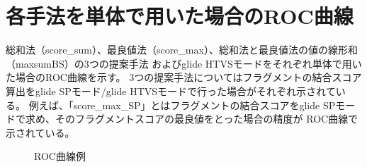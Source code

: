 \chapter{各手法を単体で用いた場合のROC曲線}\label{appendix:roc}
総和法（score\_sum）、最良値法（score\_max）、総和法と最良値法の値の線形和（maxsumBS）の3つの提案手法
およびglide HTVSモードをそれぞれ単体で用いた場合のROC曲線を示す。
3つの提案手法についてはフラグメントの結合スコア算出をglide SPモード/glide HTVSモードで行った場合がそれぞれ示されている。
例えば、「score\_max\_SP」とはフラグメントの結合スコアをglide SPモードで求め、そのフラグメントスコアの最良値をとった場合の精度が
ROC曲線で示されている。
\begin{figure}[tb]
 \begin{minipage}{0.5\hsize}
  \begin{center}
  \end{center}
 \end{minipage}
 \begin{minipage}{0.5\hsize}
  \begin{center}
  \end{center}
 \end{minipage}
 \begin{minipage}{0.5\hsize}
  \begin{center}
  \end{center}
 \end{minipage}
 \begin{minipage}{0.5\hsize}
  \begin{center}
  \end{center}
 \end{minipage}
 \begin{minipage}{0.5\hsize}
  \begin{center}
  \end{center}
 \end{minipage}
 \begin{minipage}{0.5\hsize}
  \begin{center}
  \end{center}
 \end{minipage}
  \caption{ROC曲線例}
  \label{fig:roc:1}
\end{figure}
